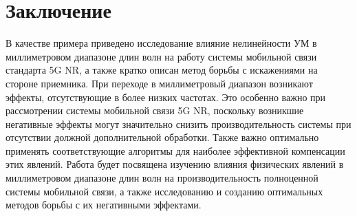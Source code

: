 \documentclass{unn}
\begin{document}
\section{Заключение}
В качестве примера приведено исследование влияние нелинейности УМ в
миллиметровом диапазоне длин волн на работу системы мобильной связи
стандарта 5G NR, а также кратко описан метод борьбы с искажениями на
стороне приемника. При переходе в миллиметровый диапазон возникают эффекты,
отсутствующие в более низких частотах. Это особенно важно при рассмотрении
системы мобильной связи 5G NR, поскольку возникшие негативные эффекты могут
значительно снизить производительность системы при отсутствии должной
дополнительной обработки. Также важно оптимально применять соответствующие
алгоритмы для наиболее эффективной компенсации этих явлений. Работа будет
посвящена изучению влияния физических явлений в миллиметровом диапазоне
длин волн на производительность полноценной системы мобильной связи, а
также исследованию и созданию оптимальных методов борьбы с их негативными эффектами.


\newpage
{\footnotesize
\printbibliography
}
\end{document}
